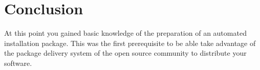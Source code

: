 



\section{Conclusion}

At this point you gained basic knowledge of the preparation of an automated installation package. 
This was the first prerequisite to be able take advantage of the package delivery system of the open source community
to distribute your software. 
